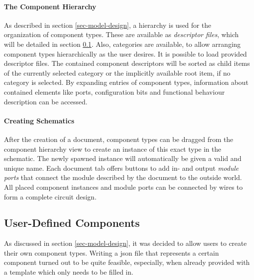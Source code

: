	\paragraph{The Component Hierarchy}
		As described in section \ref{sec-model-design}, a hierarchy is used for the organization of component types.
		These are available as \emph{descriptor files}, which will be detailed in section \ref{sec-user-defined-components}.
		Also, categories are available, to allow arranging component types hierarchically as the user desires.  
		It is possible to load provided descriptor files. 
		The contained component descriptors will be sorted as child items of the currently selected category or the implicitly available root item, if no category is selected.
		By expanding entries of component types, information about contained elements like ports, configuration bits and functional behaviour description can be accessed.

	\paragraph{Creating Schematics}
		After the creation of a document, component types can be dragged from the component hierarchy view to create an instance of this exact type in the schematic.
		The newly spawned instance will automatically be given a valid and unique name.
		Each document tab offers buttons to add in- and output \emph{module ports} that connect the module described by the document to the outside world.
		All placed component instances and module ports can be connected by wires to form a complete circuit design.
	
\subsection{User-Defined Components}
	\label{sec-user-defined-components}
	
	As discussed in section \ref{sec-model-design}, it was decided to allow users to create their own component types.
	Writing a \gls{json} file that represents a certain component turned out to be quite feasible, especially, when already provided with a template which only needs to be filled in.
	
